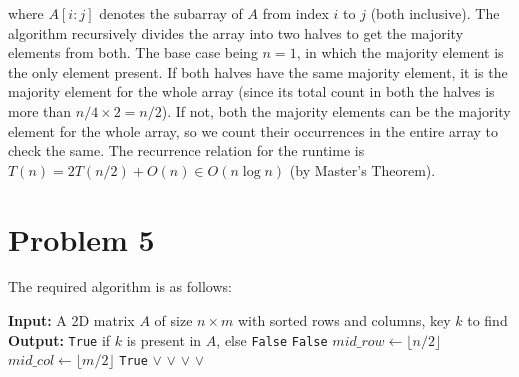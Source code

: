 \documentclass{article}
\begin{document}
  where $A[i:j]$ denotes the subarray of $A$ from index $i$ to $j$ (both inclusive).
  The algorithm recursively divides the array into two halves to get the majority elements from both.
  The base case being $n = 1$, in which the majority element is the only element present.
  If both halves have the same majority element, it is the majority element for the whole array (since its total count in both the halves is more than $n/4 \times 2 = n/2$).
  If not, both the majority elements can be the majority element for the whole array, so we count their occurrences in the entire array to check the same.
  The recurrence relation for the runtime is $T(n) = 2T(n/2) + O(n) \in O(n \log n)$ (by Master's Theorem).

\section{Problem 5}
  The required algorithm is as follows:
  \begin{algorithm}
    \caption{2D Binary Search}
    \begin{algorithmic}
      \State \textbf{Input:} A 2D matrix $A$ of size $n \times m$ with sorted rows and columns, key $k$ to find
      \State \textbf{Output:} \texttt{True} if $k$ is present in $A$, else \texttt{False}
          \State \Return \texttt{False}
        \EndIf
        \State $mid\_row \gets \lfloor n / 2 \rfloor$
        \State $mid\_col \gets \lfloor m / 2 \rfloor$
          \State \Return \texttt{True}
          \State \Return {} $\lor$
          \Statex \hspace{4em}  $\lor$
          \Statex \hspace{4em} 
        \Else
          \State \Return {} $\lor$
          \Statex \hspace{4em}  $\lor$
          \Statex \hspace{4em} 
        \EndIf
      \EndFunction
    \end{algorithmic}
  \end{algorithm}
\end{document}
